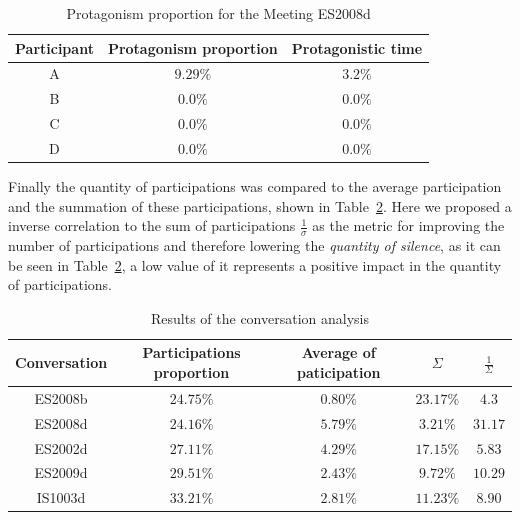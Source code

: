 \begin{table}[]
    \centering
    \begin{tabular}{ccc}
    \hline
    Participant & Protagonism proportion & Protagonistic time\\ \hline 
    A           & $9.29\%$               & $3.2\%$            \\
    B           & $0.0\%$                & $0.0\%$            \\
    C           & $0.0\%$                & $0.0\%$            \\
    D           & $0.0\%$                & $0.0\%$            \\
    \hline
    \end{tabular}
    \caption{Protagonism proportion for the Meeting ES2008d}
    \label{table:res_ES2008d}
\end{table}

Finally the quantity of participations was compared to the average participation and the summation of these participations, shown in Table~\ref{table:results_ami}. Here we proposed a inverse correlation to the sum of participations $\frac{1}{\sigma}$ as the metric for improving the number of participations and therefore lowering the \textit{quantity of silence}, as it can be seen in Table~\ref{table:results_ami}, a low value of it represents a positive impact in the quantity of participations.\\

\begin{table}[]
    \centering
    \begin{tabular}{ccccc}
    \hline
    Conversation & Participations proportion & Average  of paticipation & $\Sigma$ & $\frac{1}{\Sigma}$ \\ \hline
    ES2008b      & $24.75\%$                 & $0.80\%$                                                              & $23.17\%$  & $4.3$               \\
    ES2008d      & $24.16\%$                 & $5.79\%$                                                              & $3.21\%$   & $31.17$              \\
    ES2002d      & $27.11\%$                 & $4.29\%$                                                              & $17.15\%$  & $5.83$               \\
    ES2009d      & $29.51\%$                 & $2.43\%$                                                                & $9.72\%$   & $10.29$              \\
    IS1003d      & $33.21\%$                 & $2.81\%$                                                                & $11.23\%$  & $8.90$              \\
    \hline
    \end{tabular}
    \caption{Results of the conversation analysis}
    \label{table:results_ami}
\end{table}

